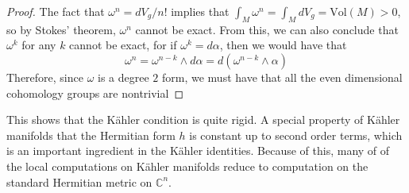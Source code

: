 \documentclass[psamsfonts, 12pt]{amsart}
\theoremstyle{definition}
\theoremstyle{remark}
\newcommand{\C}{\mathbb{C}}
\begin{document}
%
\begin{proof}
The fact that $\omega^n = dV_g/n!$ implies that
$\int_M \omega^n = \int_M dV_g = \mathrm{Vol}(M) > 0$, so by Stokes' theorem,
$\omega^n$ cannot be exact. From this, we can also conclude that $\omega^k$ for any
$k$ cannot be exact, for if $\omega^k = d\alpha$, then we would have that
\[
\omega^n = \omega^{n-k} \wedge d\alpha = d(\omega^{n-k} \wedge \alpha)
\]
Therefore, since $\omega$ is a degree $2$ form, we must have that all the even
dimensional cohomology groups are nontrivial
\end{proof}
%
This shows that the K\"ahler condition is quite rigid. A special property of K\"ahler
manifolds that the Hermitian form $h$ is constant up to second order terms, which is
an important ingredient in the K\"ahler identities. Because of this, many of of the
local computations on K\"ahler manifolds reduce to computation on the standard
Hermitian metric on $\C^n$.
%
%
\end{document}

